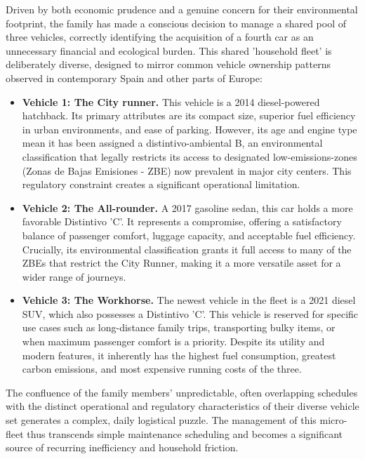 \textgap

Driven by both economic prudence and a genuine concern for their environmental footprint, the family has made a conscious decision to manage a shared pool of three vehicles, correctly identifying the acquisition of a fourth car as an unnecessary financial and ecological burden. This shared 'household fleet' is deliberately diverse, designed to mirror common vehicle ownership patterns observed in contemporary Spain and other parts of Europe:

\begin{itemize}
\item \textbf{Vehicle 1: The City runner.} This vehicle is a 2014 diesel-powered hatchback. Its primary attributes are its compact size, superior fuel efficiency in urban environments, and ease of parking. However, its age and engine type mean it has been assigned a \gls{distintivo-ambiental} B, an environmental classification that legally restricts its access to designated \gls{low-emissions-zones} (Zonas de Bajas Emisiones - ZBE) now prevalent in major city centers. This regulatory constraint creates a significant operational limitation.
\item \textbf{Vehicle 2: The All-rounder.} A 2017 gasoline sedan, this car holds a more favorable Distintivo 'C'. It represents a compromise, offering a satisfactory balance of passenger comfort, luggage capacity, and acceptable fuel efficiency. Crucially, its environmental classification grants it full access to many of the ZBEs that restrict the City Runner, making it a more versatile asset for a wider range of journeys.
\item \textbf{Vehicle 3: The Workhorse.} The newest vehicle in the fleet is a 2021 diesel SUV, which also possesses a Distintivo 'C'. This vehicle is reserved for specific use cases such as long-distance family trips, transporting bulky items, or when maximum passenger comfort is a priority. Despite its utility and modern features, it inherently has the highest fuel consumption, greatest carbon emissions, and most expensive running costs of the three.
\end{itemize}

The confluence of the family members' unpredictable, often overlapping schedules with the distinct operational and regulatory characteristics of their diverse vehicle set generates a complex, daily logistical puzzle. The management of this micro-fleet thus transcends simple maintenance scheduling and becomes a significant source of recurring inefficiency and household friction.

